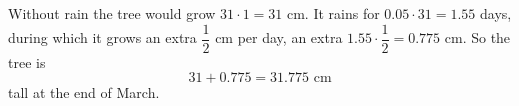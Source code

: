 Without rain the tree would grow $31\cdot1=31$ cm. It rains for $0.05\cdot31=1.55$ days, during which it grows an extra $\dfrac{1}{2}$ cm per day, an extra $1.55\cdot\dfrac{1}{2}=0.775$ cm. So the tree is
\[31+0.775=\boxed{31.775\text{ cm}}\]
tall at the end of March.
